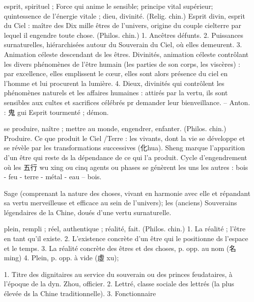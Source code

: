    


\begin{Def}[shen 神 ]
    esprit, spirituel ; Force qui anime le sensible; principe vital supérieur; quintessence de l’énergie vitale ; dieu, divinité. (Relig. chin.)     Esprit divin, esprit du Ciel : maître des Dix mille êtres de l’univers, origine du couple cielterre par lequel il engendre toute chose. (Philos. chin.) 1. Ancêtres défunts. 2. Puissances surnaturelles, hiérarchisées autour du Souverain du Ciel, où elles demeurent. 3. Animation céleste descendant ds les êtres. Divinités, animation céleste contrôlant les divers phénomènes de l’être humain (les parties de son corps, les viscères) : par excellence, elles emplissent le cœur, elles sont alors présence du ciel en l’homme et lui procurent la lumière. 4. Dieux, divinités qui contrôlent les phénomènes naturels et les affaires humaines : attirés par la vertu, ils sont sensibles aux cultes et sacrifices célébrés pr demander leur bienveillance. – Anton. : 鬼 gui Esprit tourmenté ; démon. 
\end{Def}
\begin{Def}[sheng 生]
     se produire, naître ; mettre au monde, engendrer, enfanter.     (Philos. chin.) Produire. Ce que produit le Ciel /Terre : les vivants, dont la vie se développe et se révèle par les transformations successives (化hua). Sheng marque l’apparition d’un être qui reste ds la dépendance de ce qui l’a produit.     Cycle d’engendrement où les 五行 wu xing ou cinq agents ou phases se génèrent les uns les autres : bois - feu - terre - métal - eau – bois. 
\end{Def}
\begin{Def}[sheng 聖]
    Sage (comprenant la nature des choses, vivant en harmonie avec elle et répandant sa vertu merveilleuse et efficace au sein de l’univers); les (anciens) Souverains légendaires de la Chine, doués d’une vertu surnaturelle.	
\end{Def}
\begin{Def}[shi 實 ]
    plein, rempli ; réel, authentique ; réalité, fait. (Philos. chin.) 1. La réalité ; l’être en tant qu’il existe. 2. L’existence concrète d’un être qui le positionne ds l’espace et le temps. 3. La réalité concrète des êtres et des choses, p. opp. au nom (名 ming) 4. Plein, p. opp. à vide (虛 xu); 
\end{Def}

\begin{Def}[shi 士 ]
    1. Titre des dignitaires au service du souverain ou des princes feudataires, à l’époque de la dyn. Zhou, officier. 2. Lettré, classe sociale des lettrés (la plus élevée ds la Chine traditionnelle). 3. Fonctionnaire 
\end{Def}
 
